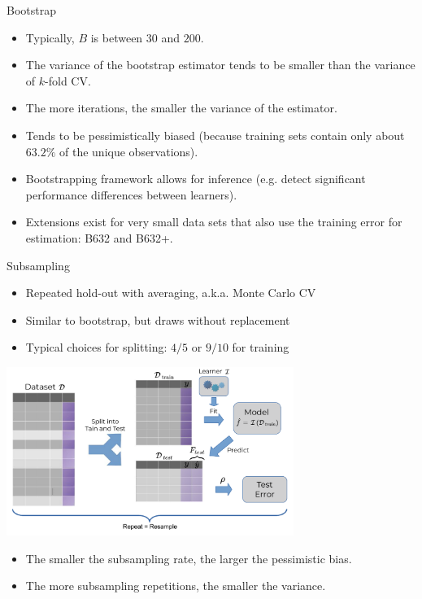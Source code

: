 \documentclass[11pt,compress,t,notes=noshow, xcolor=table]{beamer}
\begin{document}
\begin{vbframe}{Bootstrap}
\framebreak

\begin{itemize}
  \item Typically, $B$ is between $30$ and $200$.
  \item The variance of the bootstrap estimator tends to be smaller than the
  variance of $k$-fold CV.
  \item The more iterations, the smaller the variance of the estimator.
  \item Tends to be pessimistically biased
  (because training sets contain only about $63.2 \%$ of the unique observations).
  \item Bootstrapping framework allows for inference 
  (e.g. detect significant performance differences between learners).
  \item Extensions exist for very small data sets that also use the training error for  estimation: B632 and B632+.
\end{itemize}

\end{vbframe}


\begin{vbframe}{Subsampling}

\begin{itemize}
  \item Repeated hold-out with averaging, a.k.a. Monte Carlo CV
  \item Similar to bootstrap, but draws without replacement
  \item Typical choices for splitting: $4/5$ or $9/10$ for training
\end{itemize}
\begin{center}
\includegraphics[width=0.7\textwidth]{figure_man/resampling_error.pdf}
\end{center}
\begin{itemize}
  \item The smaller the subsampling rate, the larger the pessimistic bias.
  \item The more subsampling repetitions, the smaller the variance.
\end{itemize}

\end{vbframe}
\end{document}
